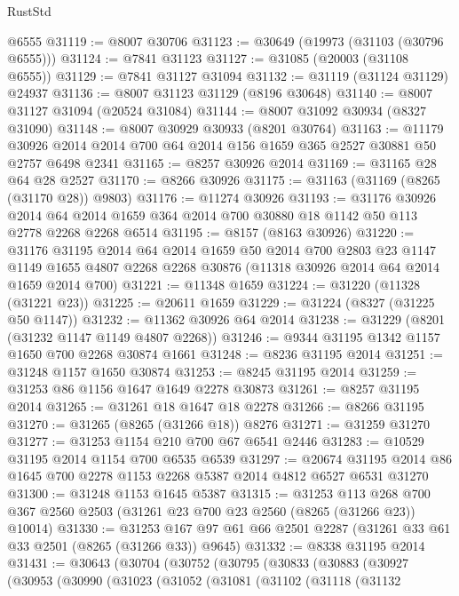 \begin{lexlean}{RustStd}
\begin{coremodule}
    @6555
@31119 := @8007 @30706
@31123 := @30649 (@19973 (@31103 (@30796 @6555)))
@31124 := @7841 @31123
@31127 := @31085 (@20003 (@31108 @6555))
@31129 := @7841 @31127 @31094
@31132 := @31119 (@31124 @31129) @24937
@31136 := @8007 @31123 @31129 (@8196 @30648)
@31140 := @8007 @31127 @31094 (@20524 @31084)
@31144 := @8007 @31092 @30934 (@8327 @31090)
@31148 := @8007 @30929 @30933 (@8201 @30764)
@31163 := @11179
    @30926
    @2014
    @2014
    @700
    @64
    @2014
    @156
    @1659
    @365
    @2527
    @30881
    @50
    @2757
    @6498
    @2341
@31165 := @8257 @30926 @2014
@31169 := @31165 @28 @64 @28 @2527
@31170 := @8266 @30926
@31175 := @31163 (@31169 (@8265 (@31170 @28)) @9803)
@31176 := @11274 @30926
@31193 := @31176
    @30926
    @2014
    @64
    @2014
    @1659
    @364
    @2014
    @700
    @30880
    @18
    @1142
    @50
    @113
    @2778
    @2268
    @2268
    @6514
@31195 := @8157 (@8163 @30926)
@31220 := @31176
    @31195
    @2014
    @64
    @2014
    @1659
    @50
    @2014
    @700
    @2803
    @23
    @1147
    @1149
    @1655
    @4807
    @2268
    @2268
    @30876
    (@11318 @30926 @2014 @64 @2014 @1659 @2014 @700)
@31221 := @11348 @1659
@31224 := @31220 (@11328 (@31221 @23))
@31225 := @20611 @1659
@31229 := @31224 (@8327 (@31225 @50 @1147))
@31232 := @11362 @30926 @64 @2014
@31238 := @31229 (@8201 (@31232 @1147 @1149 @4807 @2268))
@31246 := @9344 @31195 @1342 @1157 @1650 @700 @2268 @30874 @1661
@31248 := @8236 @31195 @2014
@31251 := @31248 @1157 @1650 @30874
@31253 := @8245 @31195 @2014
@31259 := @31253 @86 @1156 @1647 @1649 @2278 @30873
@31261 := @8257 @31195 @2014
@31265 := @31261 @18 @1647 @18 @2278
@31266 := @8266 @31195
@31270 := @31265 (@8265 (@31266 @18)) @8276
@31271 := @31259 @31270
@31277 := @31253 @1154 @210 @700 @67 @6541 @2446
@31283 := @10529 @31195 @2014 @1154 @700 @6535 @6539
@31297 := @20674 @31195 @2014 @86 @1645 @700 @2278 @1153 @2268 @5387 @2014 @4812 @6527 @6531 @31270
@31300 := @31248 @1153 @1645 @5387
@31315 := @31253
    @113
    @268
    @700
    @367
    @2560
    @2503
    (@31261 @23 @700 @23 @2560 (@8265 (@31266 @23)) @10014)
@31330 := @31253 @167 @97 @61 @66 @2501 @2287 (@31261 @33 @61 @33 @2501 (@8265 (@31266 @33)) @9645)
@31332 := @8338 @31195 @2014
@31431 := @30643
    (@30704
      (@30752
        (@30795
          (@30833
            (@30883
              (@30927
                (@30953
                  (@30990
                    (@31023
                      (@31052
                        (@31081
                          (@31102
                            (@31118
                              (@31132

\end{coremodule}
\end{lexlean}
